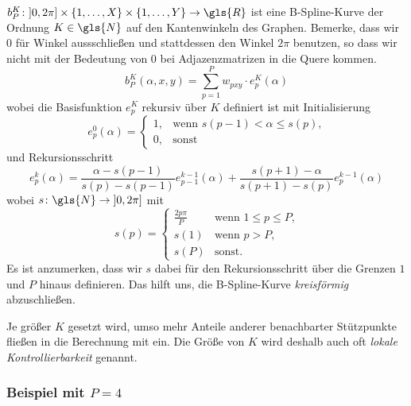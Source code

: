 $b_P^K \colon \left]0, 2\pi\right] \times \left\{1, \ldots, X \right\} \times \left\{1, \ldots, Y\right\} \to \gls{R}$ ist eine B-Spline-Kurve der Ordnung $K \in \gls{N}$ auf den Kantenwinkeln des Graphen.
Bemerke, dass wir $0$ für Winkel aussschließen und stattdessen den Winkel $2\pi$ benutzen, so dass wir nicht mit der Bedeutung von $0$ bei Adjazenzmatrizen in die Quere kommen.
\begin{equation}
  b_P^K\left(\alpha, x, y \right) = \sum_{p=1}^P w_{pxy} \cdot e_p^K\left(\alpha\right)
\end{equation}
wobei die Basisfunktion $e_p^K$ rekursiv über $K$ definiert ist mit Initialisierung
\begin{equation}
  e_p^0\left(\alpha\right) = \begin{cases}
    1, & \text{wenn }s\left(p-1\right) < \alpha \leq s\left(p\right)\text{,}\\
    0, & \text{sonst}
  \end{cases}
\end{equation}
und Rekursionsschritt
\begin{equation}
  e_p^k\left(\alpha\right) = \frac{\alpha - s\left(p-1\right)}{s\left(p\right) - s\left(p-1\right)} e_{p-1}^{k-1}\left(\alpha\right) + \frac{s\left(p+1\right) - \alpha}{s\left(p+1\right) - s\left(p\right)} e_p^{k-1}\left(\alpha\right)
\end{equation}
wobei $s \colon \gls{N} \to \left]0, 2\pi\right]$ mit
\begin{equation}
  s\left(p\right) = \begin{cases}
    \frac{2p\pi}{P} & \text{wenn }1 \leq p \leq P\text{,}\\
    s\left(1\right) & \text{wenn }p > P\text{,}\\
    s\left(P\right) & \text{sonst.}
  \end{cases}
\end{equation}
Es ist anzumerken, dass wir $s$ dabei für den Rekursionsschritt über die Grenzen $1$ und $P$ hinaus definieren.
Das hilft uns, die B-Spline-Kurve \emph{kreisförmig} abzuschließen.

Je größer $K$ gesetzt wird, umso mehr Anteile anderer benachbarter Stützpunkte fließen in die Berechnung mit ein.
Die Größe von $K$ wird deshalb auch oft \emph{lokale Kontrollierbarkeit} genannt.

\subsubsection{Beispiel mit $P=4$}

